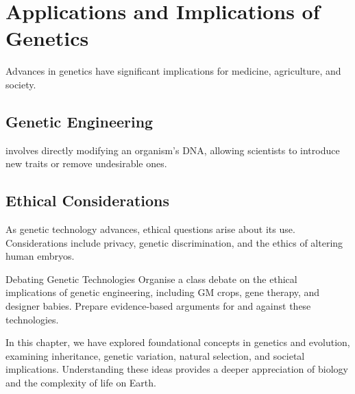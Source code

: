 \section{Applications and Implications of Genetics}

Advances in genetics have significant implications for medicine, agriculture, and society.

\subsection{Genetic Engineering}

 involves directly modifying an organism's DNA, allowing scientists to introduce new traits or remove undesirable ones.

\subsection{Ethical Considerations}

As genetic technology advances, ethical questions arise about its use. Considerations include privacy, genetic discrimination, and the ethics of altering human embryos.


\begin{investigation}{Debating Genetic Technologies}
Organise a class debate on the ethical implications of genetic engineering, including GM crops, gene therapy, and designer babies. Prepare evidence-based arguments for and against these technologies.
\end{investigation}


In this chapter, we have explored foundational concepts in genetics and evolution, examining inheritance, genetic variation, natural selection, and societal implications. Understanding these ideas provides a deeper appreciation of biology and the complexity of life on Earth.